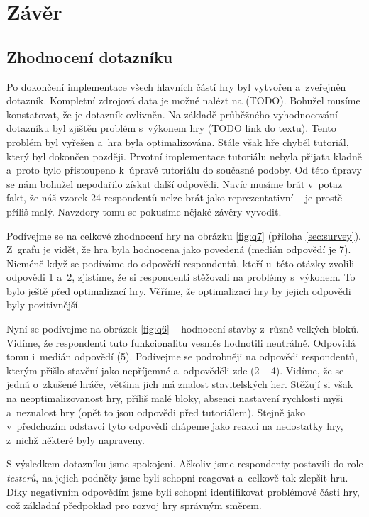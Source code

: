 
\chapter{Závěr}

\section{Zhodnocení dotazníku}
\label{sec:quest}

Po dokončení implementace všech hlavních částí hry byl vytvořen a~zveřejněn dotazník. Kompletní zdrojová data je možné nalézt na (TODO). Bohužel musíme konstatovat, že je dotazník ovlivněn. Na základě průběžného vyhodnocování dotazníku byl zjištěn problém s~výkonem hry (TODO link do textu). Tento problém byl vyřešen a~hra byla optimalizována. Stále však hře chyběl tutoriál, který byl dokončen později. Prvotní implementace tutoriálu nebyla přijata kladně a~proto bylo přistoupeno k~úpravě tutoriálu do současné podoby. Od této úpravy se nám bohužel nepodařilo získat další odpovědi. Navíc musíme brát v~potaz fakt, že náš vzorek 24 respondentů nelze brát jako reprezentativní -- je prostě příliš malý. Navzdory tomu se pokusíme nějaké závěry vyvodit.

Podívejme se na celkové zhodnocení hry na obrázku \ref{fig:q7} (příloha \ref{sec:survey}). Z~grafu je vidět, že hra byla hodnocena jako povedená (medián odpovědí je 7). Nicméně když se podíváme do odpovědí respondentů, kteří u~této otázky zvolili odpovědi 1 a~2, zjistíme, že si respondenti stěžovali na problémy s~výkonem. To bylo ještě před optimalizací hry. Věříme, že optimalizací hry by jejich odpovědi byly pozitivnější. 

Nyní se podívejme na obrázek \ref{fig:q6} -- hodnocení stavby z~různě velkých bloků. Vidíme, že respondenti tuto funkcionalitu vesměs hodnotili neutrálně. Odpovídá tomu i~medián odpovědí (5). Podívejme se podrobněji na odpovědi respondentů, kterým přišlo stavění jako nepříjemné a~odpověděli zde (2 -- 4). Vidíme, že se jedná o~zkušené hráče, většina jich má znalost stavitelských her. Stěžují si však na neoptimalizovanost hry, příliš malé bloky, absenci nastavení rychlosti myši a~neznalost hry (opět to jsou odpovědi před tutoriálem). Stejně jako v~předchozím odstavci tyto odpovědi chápeme jako reakci na nedostatky hry, z~nichž některé byly napraveny.

S výsledkem dotazníku jsme spokojeni. Ačkoliv jsme respondenty postavili do role \textit{testerů}, na jejich podněty jsme byli schopni reagovat a~celkově tak zlepšit hru. Díky negativním odpovědím jsme byli schopni identifikovat problémové části hry, což základní předpoklad pro rozvoj hry správným směrem.

